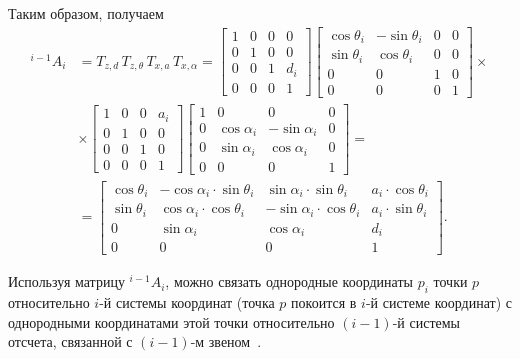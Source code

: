 \documentclass[oneside, final, 14pt]{extarticle}
\begin{document}
Таким образом, получаем
\begin{equation}
\begin{aligned}
   {}^{i-1}A_i & = T_{z,d}\,T_{z,\theta}\,T_{x,a}\,T_{x,\alpha} = 
  \begin{bmatrix}
    1 & 0 & 0 & 0 \\
	0 & 1 & 0 & 0 \\
	0 & 0 & 1 & d_i \\
	0 & 0 & 0 & 1
  \end{bmatrix}
  \begin{bmatrix}
    \cos{\theta_i} & -\sin{\theta_i} & 0 & 0 \\
	\sin{\theta_i} & \cos{\theta_i} & 0 & 0 \\
	0 & 0 & 1 & 0 \\
	0 & 0 & 0 & 1
  \end{bmatrix}
  \times
  \\
  & \times
  \begin{bmatrix}
    1 & 0 & 0 & a_i \\
	0 & 1 & 0 & 0 \\
	0 & 0 & 1 & 0 \\
	0 & 0 & 0 & 1
  \end{bmatrix}
  \begin{bmatrix}
    1 & 0 & 0 & 0 \\
	0 & \cos{\alpha_i} & -\sin{\alpha_i} & 0 \\
	0 & \sin{\alpha_i} & \cos{\alpha_i} & 0 \\
	0 & 0 & 0 & 1
  \end{bmatrix}
  =
  \\
  & =
  \begin{bmatrix}
    \cos{\theta_i} & -\cos{\alpha_i}\cdot\sin{\theta_i} & \sin{\alpha_i}\cdot\sin{\theta_i} & a_i\cdot\cos{\theta_i} \\
	\sin{\theta_i} & \cos{\alpha_i}\cdot\cos{\theta_i} & -\sin{\alpha_i}\cdot\cos{\theta_i} & a_i\cdot\sin{\theta_i} \\
	0 & \sin{\alpha_i} & \cos{\alpha_i} & d_i \\
	0 & 0 & 0 & 1
  \end{bmatrix}
  .
\end{aligned}
\label{f:dh-matrix}
\end{equation}
\par
Используя матрицу \({}^{i-1}A_i\), можно связать однородные координаты \(p_i\) точки \(p\) относительно \(i\)-й системы координат (точка \(p\) покоится в \(i\)-й системе координат) с однородными координатами этой точки относительно \((i-1)\)-й системы отсчета, связанной с \((i-1)\)-м звеном~\cite{fu:rob_tech}.
\end{document}
